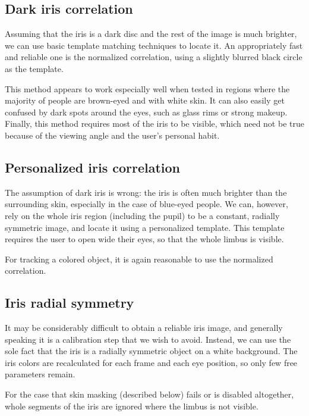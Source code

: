 \subsection{Dark iris correlation}
Assuming that the iris is a dark disc and the rest of the image is much brighter, we can use basic template matching techniques to locate it.
An appropriately fast and reliable one is the normalized correlation, using a slightly blurred black circle as the template.

This method appears to work especially well when tested in regions where the majority of people are brown-eyed and with white skin.
It can also easily get confused by dark spots around the eyes, such as glass rims or strong makeup.
Finally, this method requires most of the iris to be visible, which need not be true because of the viewing angle and the user's personal habit.

\subsection{Personalized iris correlation}
The assumption of dark iris is wrong: the iris is often much brighter than the surrounding skin, especially in the case of blue-eyed people.
We can, however, rely on the whole iris region (including the pupil) to be a constant, radially symmetric image, and locate it using a personalized template.
This template requires the user to open wide their eyes, so that the whole limbus is visible.

For tracking a colored object, it is again reasonable to use the normalized correlation.


\subsection{Iris radial symmetry}

It may be considerably difficult to obtain a reliable iris image, and generally speaking it is a calibration step that we wish to avoid.
Instead, we can use the sole fact that the iris is a radially symmetric object on a white background.
The iris colors are recalculated for each frame and each eye position, so only few free parameters remain.

For the case that skin masking (described below) fails or is disabled altogether, whole segments of the iris are ignored where the limbus is not visible.

